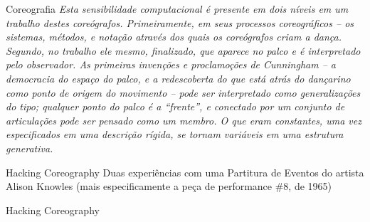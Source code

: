 \documentclass[aspectratio=169]{beamer}
\begin{document}
\begin{frame}{Coreografia}
\emph{Esta sensibilidade computacional é presente em dois níveis em um trabalho destes coreógrafos. Primeiramente, em seus processos coreográficos -- os sistemas, métodos, e notação através dos quais os coreógrafos criam a dança. Segundo, no trabalho ele mesmo, finalizado, que aparece no palco e é interpretado pelo observador. As primeiras invenções e proclamoções de Cunningham -- a democracia do espaço do palco, e a redescoberta do que está atrás do dançarino como ponto de origem do movimento -- pode ser interpretado como generalizações do tipo; qualquer ponto do palco é a ``frente'', e conectado por um conjunto de articulações pode ser pensado como um membro. O que eram constantes, uma vez especificados em uma descrição rígida, se tornam variáveis em uma estrutura generativa.}\cite[cap.~1, p.~2--4]{downie_choreography_2005}
\end{frame}

\begin{frame}{Hacking Coreography}
Duas experiências com uma Partitura de Eventos do artista Alison Knowles (mais especificamente a peça de performance \#8, de 1965)
\end{frame}


\begin{frame}{Hacking Coreography}
\oito
\end{frame}
\end{document}
